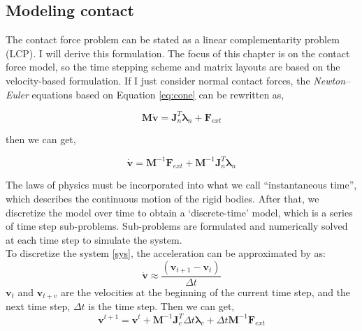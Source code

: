 \subsection{Modeling contact}
    The contact force problem can be stated as a linear complementarity problem (LCP)\cite{bender2014interactive}. I will derive this formulation. The focus of this chapter is on the contact force model, so the time stepping scheme and matrix layouts are based on the velocity-based formulation. If I just consider normal contact forces, the \textit{Newton–Euler} equations based on Equation \ref{eq:cone} can be rewritten as,

    \begin{equation}
        \pmb{M}\dot{\mathbf{v}} = \pmb{J}_{n}^{T}\pmb{\lambda}_n + \mathbf{F}_{ext}
    \end{equation}

    then we can get,

    \begin{equation}
        \dot{\mathbf{v}} = \pmb{M}^{-1}\mathbf{F}_{ext} + \pmb{M}^{-1}\pmb{J}_{n}^{T}\pmb{\lambda}_{n}
        \label{sys}
    \end{equation}

    The laws of physics must be incorporated into what we call ``instantaneous time'', which describes the continuous motion of the rigid bodies. After that, we discretize the model over time to obtain a `discrete-time' model, which is a series of time step sub-problems. Sub-problems are formulated and numerically solved at each time step to simulate the system.\\
    
    To discretize the system \ref{sys}, the acceleration can be approximated by \cite{anitescu1997modeling} as:
    \begin{equation}
        \dot{\mathbf{v}} \approx \frac{(\mathbf{v}_{t+1} - \mathbf{v}_t)}{\Delta t}
    \end{equation}
    $\mathbf{v}_t$ and $\mathbf{v}_{t+v}$ are the velocities at the beginning of the current time step, and the next time step, $\Delta t$ is the time step. Then we can get,
    \begin{equation}
        \mathbf{v}^{t+1} = \mathbf{v}^{t} + \pmb{M}^{-1}\pmb{J}_{c}^{T}\Delta{t}\pmb{\lambda}_{c} + \Delta{t}\pmb{M}^{-1}\mathbf{F}_{ext}
    \end{equation}

